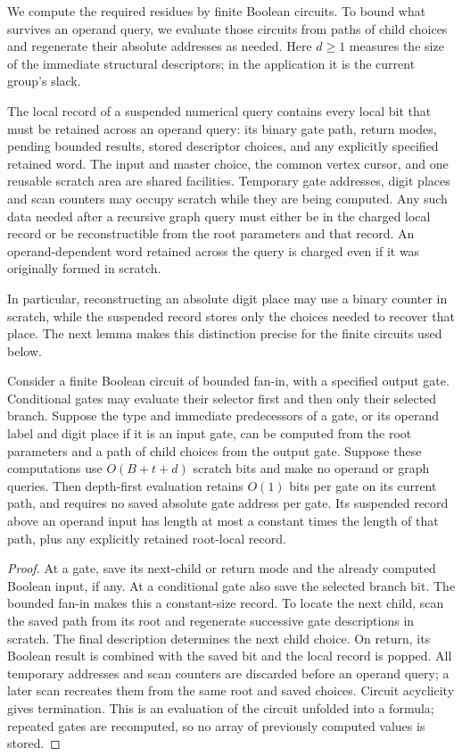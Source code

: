 We compute the required residues by finite Boolean circuits.  To bound
what survives an operand query, we evaluate those circuits from paths
of child choices and regenerate their absolute addresses as needed.
Here $d\geq1$ measures the size of the immediate structural descriptors;
in the application it is the current group's slack.

The local record of a suspended numerical query contains every local bit
that must be retained across an operand query: its binary gate path,
return modes, pending bounded results, stored descriptor choices, and
any explicitly specified retained word.  The input and master choice,
the common vertex cursor, and one reusable scratch area are shared
facilities.  Temporary gate addresses, digit places and scan counters
may occupy scratch while they are being computed.  Any such data needed
after a recursive graph query must either be in the charged local
record or be reconstructible from the root parameters and that record.
An operand-dependent word retained across the query is charged even if
it was originally formed in scratch.

In particular, reconstructing an absolute digit place may use a binary
counter in scratch, while the suspended record stores only the choices
needed to recover that place.  The next lemma makes this distinction
precise for the finite circuits used below.

\begin{lemma}
\label{lem:arith-gate-evaluation}
Consider a finite Boolean circuit of bounded fan-in, with a specified
output gate.  Conditional gates may evaluate their selector first and
then only their selected branch.  Suppose the type and immediate predecessors of a gate,
or its operand label and digit place if it is an input gate, can be
computed from the root parameters and a path of child choices from
the output gate.  Suppose these computations use $O(B+t+d)$ scratch
bits and make no operand or graph queries.  Then depth-first
evaluation retains $O(1)$ bits per gate on its current path, and
requires no saved absolute gate address per gate.  Its suspended
record above an operand input has length at most a constant times
the length of that path, plus any explicitly retained root-local
record.
\end{lemma}

\begin{proof}
At a gate, save its next-child or return mode and the already computed
Boolean input, if any.  At a conditional gate also save the selected
branch bit.  The bounded fan-in makes this a constant-size
record.  To locate the next child, scan the saved path from its root
and regenerate successive gate descriptions in scratch.  The final
description determines the next child choice.  On return, its Boolean
result is combined with the saved bit and the local record is popped.
All temporary addresses and scan counters are discarded before an
operand query; a later scan recreates them from the same root and
saved choices.  Circuit acyclicity gives termination.  This is an
evaluation of the circuit unfolded into a formula; repeated gates are
recomputed, so no array of previously computed values is stored.
\end{proof}

